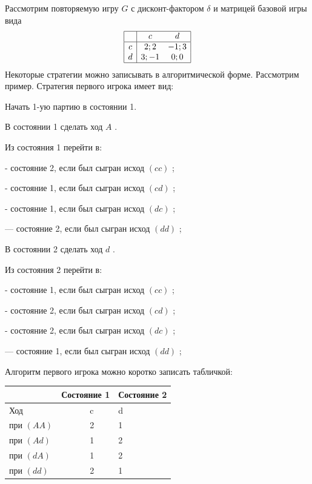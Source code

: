 \begin{problem}

Рассмотрим повторяемую игру  $G$  с дисконт-фактором  $\delta $  и матрицей базовой игры вида
\[\begin{array}{|c|cc|}  \hline {} & {c} & {d} \\  \hline {c} & {2;2} & {-1;3} \\ {d} & {3;-1} & {0;0} \\  \hline  \end{array}\]
Некоторые стратегии можно записывать в алгоритмической форме. Рассмотрим пример.
Стратегия первого игрока имеет вид:\par
Начать 1-ую партию в состоянии 1.\par
В состоянии 1 сделать ход  $A$ .\par
Из состояния 1 перейти в:\par
- состояние 2, если был сыгран исход  $\left(cc\right)$ ;\par
- состояние 1, если был сыгран исход  $\left(cd\right)$ ;\par
- состояние 1, если был сыгран исход  $\left(dc\right)$ ;\par
       — состояние 2, если был сыгран исход  $\left(dd\right)$ ;\par
В состоянии 2 сделать ход  $d$ .\par
Из состояния 2 перейти в:\par
- состояние 1, если был сыгран исход  $\left(cc\right)$ ;\par
- состояние 2, если был сыгран исход  $\left(cd\right)$ ;\par
- состояние 2, если был сыгран исход  $\left(dc\right)$ ;\par
       — состояние 1, если был сыгран исход  $\left(dd\right)$ ;\par
Алгоритм первого игрока можно коротко записать табличкой:


\begin{tabular} {|p{43.12pt}| p{19.60pt}| p{37.52pt}| p{19.60pt}| p{31.92pt}| } \hline
   &  \multicolumn{2}{|l|}{ Состояние 1 } &  \multicolumn{2}{|l|}{ Состояние 2 } \\ \hline
 \multicolumn{2}{|l|}{ Ход } &  \multicolumn{2}{|l|}{ c } &  d  \\ \hline
 \multicolumn{2}{|l|}{ при  $\left(AA\right)$  } &  \multicolumn{2}{|l|}{ 2 } &  1  \\ \hline
 \multicolumn{2}{|l|}{ при  $\left(Ad\right)$  } &  \multicolumn{2}{|l|}{ 1 } &  2  \\ \hline
 \multicolumn{2}{|l|}{ при  $\left(dA\right)$  } &  \multicolumn{2}{|l|}{ 1 } &  2  \\ \hline
 \multicolumn{2}{|l|}{ при  $\left(dd\right)$  } &  \multicolumn{2}{|l|}{ 2 } &  1  \\ \hline
\end{tabular}


\end{problem}

